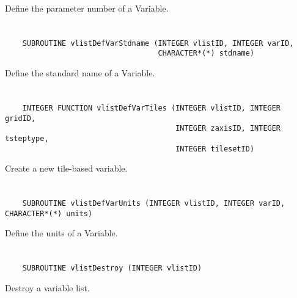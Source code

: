 Define the parameter number of a Variable.


\section*{\tt {}}

\begin{verbatim}
    SUBROUTINE vlistDefVarStdname (INTEGER vlistID, INTEGER varID,
                                   CHARACTER*(*) stdname)
\end{verbatim}

Define the standard name of a Variable.


\section*{\tt {}}

\begin{verbatim}
    INTEGER FUNCTION vlistDefVarTiles (INTEGER vlistID, INTEGER gridID,
                                       INTEGER zaxisID, INTEGER tsteptype,
                                       INTEGER tilesetID)
\end{verbatim}

Create a new tile-based variable.


\section*{\tt {}}

\begin{verbatim}
    SUBROUTINE vlistDefVarUnits (INTEGER vlistID, INTEGER varID, CHARACTER*(*) units)
\end{verbatim}

Define the units of a Variable.


\section*{\tt {}}

\begin{verbatim}
    SUBROUTINE vlistDestroy (INTEGER vlistID)
\end{verbatim}

Destroy a variable list.


\section*{\tt {}}

